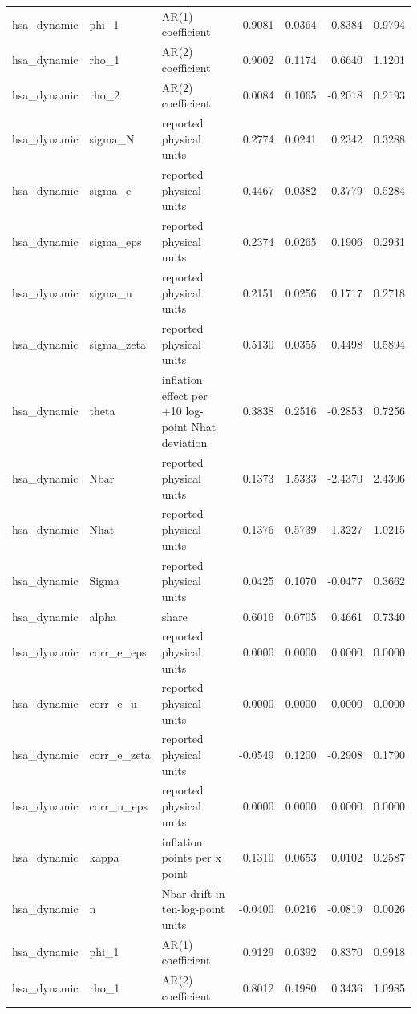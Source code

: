 \begin{tabular}{lllrrrr}
hsa\_dynamic & phi\_1 & AR(1) coefficient & 0.9081 & 0.0364 & 0.8384 & 0.9794 \\
hsa\_dynamic & rho\_1 & AR(2) coefficient & 0.9002 & 0.1174 & 0.6640 & 1.1201 \\
hsa\_dynamic & rho\_2 & AR(2) coefficient & 0.0084 & 0.1065 & -0.2018 & 0.2193 \\
hsa\_dynamic & sigma\_N & reported physical units & 0.2774 & 0.0241 & 0.2342 & 0.3288 \\
hsa\_dynamic & sigma\_e & reported physical units & 0.4467 & 0.0382 & 0.3779 & 0.5284 \\
hsa\_dynamic & sigma\_eps & reported physical units & 0.2374 & 0.0265 & 0.1906 & 0.2931 \\
hsa\_dynamic & sigma\_u & reported physical units & 0.2151 & 0.0256 & 0.1717 & 0.2718 \\
hsa\_dynamic & sigma\_zeta & reported physical units & 0.5130 & 0.0355 & 0.4498 & 0.5894 \\
hsa\_dynamic & theta & inflation effect per +10 log-point Nhat deviation & 0.3838 & 0.2516 & -0.2853 & 0.7256 \\
hsa\_dynamic & Nbar & reported physical units & 0.1373 & 1.5333 & -2.4370 & 2.4306 \\
hsa\_dynamic & Nhat & reported physical units & -0.1376 & 0.5739 & -1.3227 & 1.0215 \\
hsa\_dynamic & Sigma & reported physical units & 0.0425 & 0.1070 & -0.0477 & 0.3662 \\
hsa\_dynamic & alpha & share & 0.6016 & 0.0705 & 0.4661 & 0.7340 \\
hsa\_dynamic & corr\_e\_eps & reported physical units & 0.0000 & 0.0000 & 0.0000 & 0.0000 \\
hsa\_dynamic & corr\_e\_u & reported physical units & 0.0000 & 0.0000 & 0.0000 & 0.0000 \\
hsa\_dynamic & corr\_e\_zeta & reported physical units & -0.0549 & 0.1200 & -0.2908 & 0.1790 \\
hsa\_dynamic & corr\_u\_eps & reported physical units & 0.0000 & 0.0000 & 0.0000 & 0.0000 \\
hsa\_dynamic & kappa & inflation points per x point & 0.1310 & 0.0653 & 0.0102 & 0.2587 \\
hsa\_dynamic & n & Nbar drift in ten-log-point units & -0.0400 & 0.0216 & -0.0819 & 0.0026 \\
hsa\_dynamic & phi\_1 & AR(1) coefficient & 0.9129 & 0.0392 & 0.8370 & 0.9918 \\
hsa\_dynamic & rho\_1 & AR(2) coefficient & 0.8012 & 0.1980 & 0.3436 & 1.0985 \\

\end{tabular}
